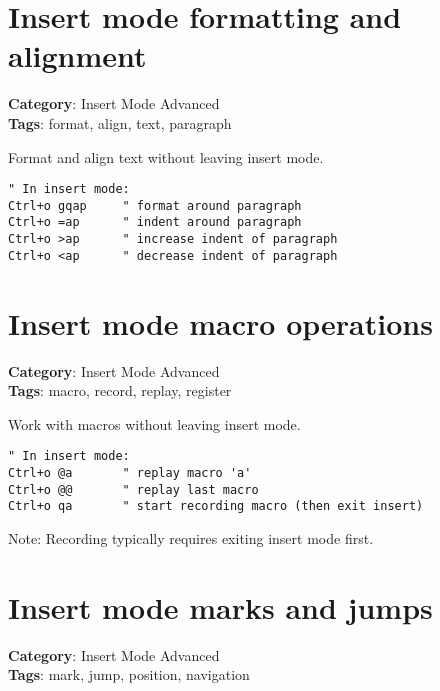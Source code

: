 {{{{{{\section{Insert mode formatting and alignment}

\textbf{Category}: Insert Mode Advanced\\ \textbf{Tags}: format, align, text, paragraph
\vspace{0.5cm}

Format and align text without leaving insert mode.

\begin{Exa*}{}
\begin{Verbatim}[fontsize=\footnotesize, breaklines, breakanywhere]
" In insert mode:
Ctrl+o gqap     " format around paragraph
Ctrl+o =ap      " indent around paragraph
Ctrl+o >ap      " increase indent of paragraph
Ctrl+o <ap      " decrease indent of paragraph
\end{Verbatim}
\end{Exa*}

\section{Insert mode macro operations}

\textbf{Category}: Insert Mode Advanced\\ \textbf{Tags}: macro, record, replay, register
\vspace{0.5cm}

Work with macros without leaving insert mode.

\begin{Exa*}{}
\begin{Verbatim}[fontsize=\footnotesize, breaklines, breakanywhere]
" In insert mode:
Ctrl+o @a       " replay macro 'a'
Ctrl+o @@       " replay last macro
Ctrl+o qa       " start recording macro (then exit insert)
\end{Verbatim}
\end{Exa*}

Note: Recording typically requires exiting insert mode first.

\section{Insert mode marks and jumps}

\textbf{Category}: Insert Mode Advanced\\ \textbf{Tags}: mark, jump, position, navigation
\vspace{0.5cm}

}}}}}}
